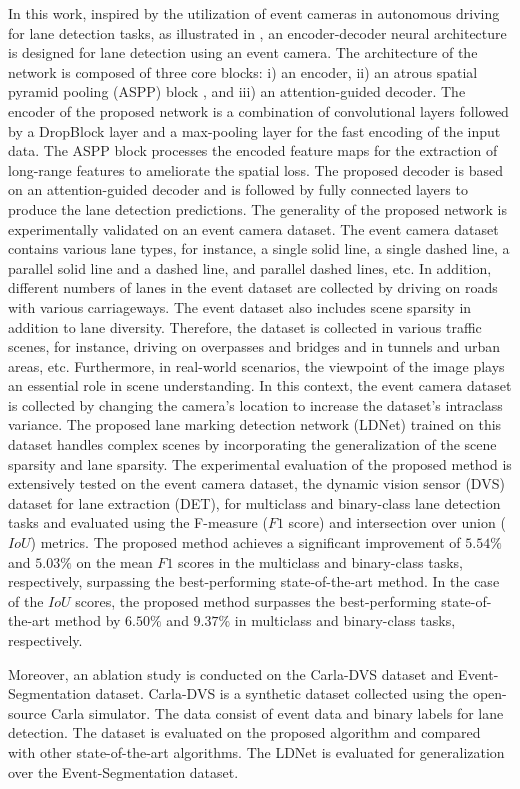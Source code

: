 \documentclass[journal]{IEEEtran}
\begin{document}
\par
In this work, inspired by the utilization of event cameras in autonomous driving for lane detection tasks, as illustrated in \cite{Cheng2019}, an encoder-decoder neural architecture is designed for lane detection using an event camera. The architecture of the network is composed of three core blocks: i) an encoder, ii) an atrous spatial pyramid pooling (ASPP) block \cite{a3} \cite{a4}, and iii) an attention-guided decoder. The encoder of the proposed network is a combination of convolutional layers followed by a DropBlock layer and a max-pooling layer for the fast encoding of the input data. The ASPP block processes the encoded feature maps for the extraction of long-range features to ameliorate the spatial loss. The proposed decoder is based on an attention-guided decoder and is followed by fully connected layers to produce the lane detection predictions. The generality of the proposed network is experimentally validated on an event camera dataset. The event camera dataset contains various lane types, for instance, a single solid line, a single dashed line, a parallel solid line and a dashed line, and parallel dashed lines, etc. In addition, different numbers of lanes in the event dataset are collected by driving on roads with various carriageways. The event dataset also includes scene sparsity in addition to lane diversity. Therefore, the dataset is collected in various traffic scenes, for instance, driving on overpasses and bridges and in tunnels and urban areas, etc. Furthermore, in real-world scenarios, the viewpoint of the image plays an essential role in scene understanding. In this context, the event camera dataset is collected by changing the camera's location to increase the dataset's intraclass variance. The proposed 
lane marking detection network (LDNet) 
trained on this dataset handles complex scenes by incorporating the generalization of the scene sparsity and lane sparsity. The experimental evaluation of the proposed method is extensively tested on the event camera dataset, the dynamic vision sensor (DVS) dataset for lane extraction (DET), for multiclass and binary-class lane detection tasks and evaluated using the F-measure ($F1$ score) and intersection over union ($IoU$) metrics. The proposed method achieves a significant improvement of $5.54\%$ and $5.03\%$ on the mean $F1$ scores in the multiclass and binary-class tasks, respectively, surpassing the best-performing state-of-the-art method. In the case of the $IoU$ scores, the proposed method surpasses the best-performing state-of-the-art method by $6.50\%$ and $9.37\%$ in multiclass and binary-class tasks, respectively.
\par
Moreover, an ablation study is conducted on the Carla-DVS dataset and Event-Segmentation dataset. Carla-DVS is a synthetic dataset collected using the open-source Carla simulator.  The data consist of event data and binary labels for lane detection. The dataset is evaluated on the proposed algorithm and compared with other state-of-the-art algorithms. The LDNet is evaluated for generalization over the Event-Segmentation dataset.
\end{document}
